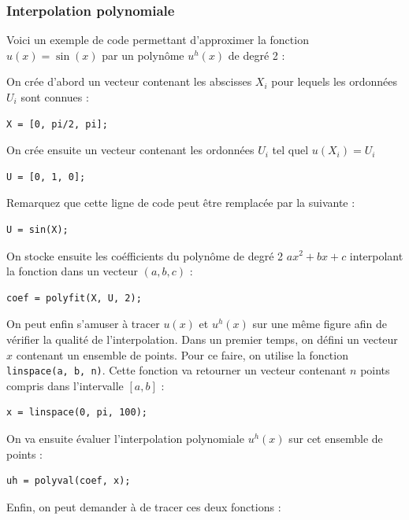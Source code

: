 \subsubsection{Interpolation polynomiale}
Voici un exemple de code \matlab{} permettant d'approximer la fonction $u(x) = \sin(x)$
par un polynôme $u^h(x)$ de degré 2 :

On crée d'abord un vecteur contenant les abscisses $X_i$ pour lequels les ordonnées
$U_i$ sont connues :

\begin{lstlisting}
X = [0, pi/2, pi];
\end{lstlisting}

On crée ensuite un vecteur contenant les ordonnées $U_i$ tel quel $u(X_i) = U_i$

\begin{lstlisting}
U = [0, 1, 0]; 
\end{lstlisting}

Remarquez que cette ligne de code peut être remplacée par la suivante :

\begin{lstlisting}
U = sin(X); 
\end{lstlisting}

On stocke ensuite les coéfficients du polynôme de degré 2 $ax^2 + bx + c$ interpolant la fonction
dans un vecteur $(a, b, c)$ :

\begin{lstlisting}
coef = polyfit(X, U, 2); 
\end{lstlisting}

On peut enfin s'amuser à tracer $u(x)$ et $u^h(x)$ sur une même figure afin de vérifier la 
qualité de l'interpolation. Dans un premier temps, on défini un vecteur $x$ contenant un
ensemble de points. Pour ce faire, on utilise la fonction \lstinline{linspace(a, b, n)}. 
Cette fonction va retourner un vecteur contenant $n$ points compris dans l'intervalle
$[a, b]$ :

\begin{lstlisting}
x = linspace(0, pi, 100); 
\end{lstlisting}

On va ensuite évaluer l'interpolation polynomiale $u^h(x)$ sur cet ensemble de points :

\begin{lstlisting}
uh = polyval(coef, x); 
\end{lstlisting}

Enfin, on peut demander à \matlab{} de tracer ces deux fonctions :


